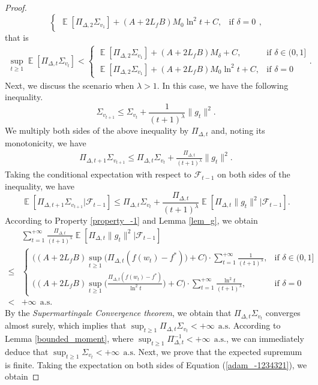 \documentclass{article} %
\DeclareMathOperator{\Expect}{\mathbb{E}}
\begin{document}
\begin{proof}
\[\begin{cases}
\Expect[\Pi_{\Delta,2}\Sigma_{v_{1}}]+(A+2L_{f}B)M_{0}\ln^{2}t+C, & \text{if } \delta = 0
\end{cases},\]
that is
\begin{align*}
    \sup_{t\ge 1}\Expect[\Pi_{\Delta,t}\Sigma_{v_{t}}]<\begin{cases} 
\Expect[\Pi_{\Delta,2}\Sigma_{v_{1}}]+(A+2L_{f}B)M_{\delta}+C, & \text{if } \delta \in (0,1] \\
\Expect[\Pi_{\Delta,2}\Sigma_{v_{1}}]+(A+2L_{f}B)M_{0}\ln^{2}t+C, & \text{if } \delta = 0
\end{cases}.
\end{align*}
Next, we discuss the scenario when $\lambda > 1$. In this case, we have the following inequality.
\[\Sigma_{v_{t+1}}\le \Sigma_{v_{t}}+\frac{1}{(t+1)^{\lambda}}\|g_{t}\|^{2}.\]
We multiply both sides of the above inequality by $\Pi_{\Delta,t}$ and, noting its monotonicity, we have
\begin{align}\label{adam_-1234321}
\Pi_{\Delta,t+1}\Sigma_{v_{t+1}}\le \Pi_{\Delta,t}\Sigma_{v_{t}}+\frac{\Pi_{\Delta,t}}{(t+1)^{\lambda}}\|g_{t}\|^{2}.
\end{align}
Taking the conditional expectation with respect to $\mathscr{F}_{t-1}$ on both sides of the inequality, we have
\[
\Expect[\Pi_{\Delta,t+1}\Sigma_{v_{t+1}}|\mathscr{F}_{t-1}]\le \Pi_{\Delta,t}\Sigma_{v_{t}}+\frac{\Pi_{\Delta,t}}{(t+1)^{\lambda}}\Expect[\Pi_{\Delta,t}\|g_{t}\|^{2}|\mathscr{F}_{t-1}].
\]
According to Property \ref{property_-1} and Lemma \ref{lem_g}, we obtain
\begin{align*}
&\sum_{t=1}^{+\infty}\frac{\Pi_{\Delta,t}}{(t+1)^{\lambda}}\Expect[\Pi_{\Delta,t}\|g_{t}\|^{2}|\mathscr{F}_{t-1}]\\\le & \begin{cases} 
\big((A+2L_{f}B)\sup_{t\ge 1}\big(\Pi_{\Delta,t}(f(w_{t})-f^*)\big)+C\big)\cdot\sum_{t=1}^{+\infty}\frac{1}{(t+1)^{\lambda}}, & \text{if } \delta \in (0,1] \\
\Big((A+2L_{f}B)\sup_{t\ge 1}\Big(\frac{\Pi_{\Delta,t}(f(w_{t})-f^*)}{\ln^{2}t}\Big)+C\Big)\cdot\sum_{t=1}^{+\infty}\frac{\ln^{2}t}{(t+1)^{\lambda}}, & \text{if } \delta = 0
\end{cases}\\< & +\infty\ \ \text{a.s.}\end{align*}
By the \textit{Supermartingale Convergence theorem}, we obtain that $\Pi_{\Delta,t}\Sigma_{v_{t}}$ converges almost surely, which implies that $\sup_{t \geq 1} \Pi_{\Delta,t}\Sigma_{v_{t}} < +\infty \ \ \text{a.s.}$ According to Lemma \ref{bounded_moment}, where $\sup_{t \geq 1} \Pi_{\Delta,t}^{-1} < +\infty \ \ \text{a.s.}$, we can immediately deduce that $\sup_{t \geq 1} \Sigma_{v_{t}} < +\infty \ \ \text{a.s.}$ Next, we prove that the expected supremum is finite. Taking the expectation on both sides of Equation (\ref{adam_-1234321}), we obtain

\end{proof}
\end{document}
